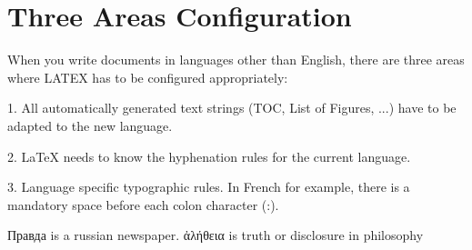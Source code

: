 \documentclass{article}
\begin{document}
\section*{Three Areas Configuration}

When you write documents in languages other than English, there are three areas where LATEX has to be configured appropriately:

1. All automatically generated text strings (TOC, List of Figures, ...) have to be adapted to the new language.

2. \LaTeX{} needs to know the hyphenation rules for the current language.

3. Language specific typographic rules. In French for example, there is a mandatory space before each colon character (:).



\textrussian{Правда} is
a russian newspaper.
\textgreek{ἀλήθεια} is truth
or disclosure in philosophy
\end{document}
